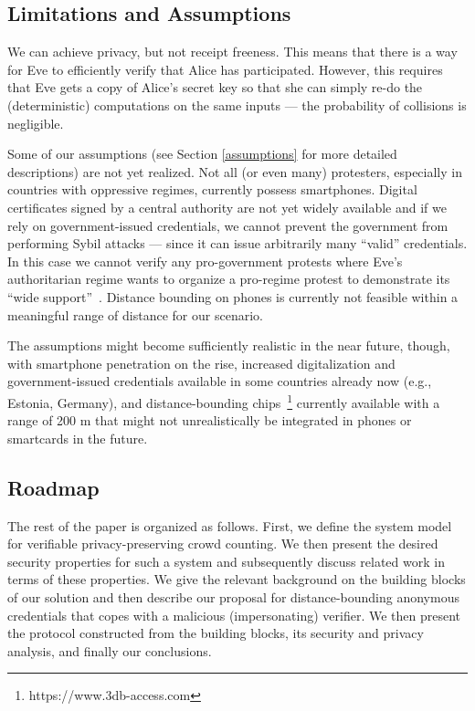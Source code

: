 \subsection{Limitations and Assumptions}

We can achieve privacy, but not receipt freeness.
This means that there is a way for Eve to efficiently verify that Alice has 
participated.
However, this requires that Eve gets a copy of Alice's secret key so that she 
can simply re-do the (deterministic) computations on the same inputs --- the 
probability of collisions is negligible.


Some of our assumptions (see Section \ref{assumptions} for more
detailed descriptions) are not yet
realized. Not all (or even many) protesters, especially in countries
with oppressive regimes, currently possess smartphones. Digital
certificates signed by a central authority are not yet widely
available and if we rely on government-issued credentials, we cannot prevent the government 
from performing Sybil attacks --- since it can issue arbitrarily many 
\enquote{valid} credentials. In this case we cannot verify any pro-government protests where Eve's authoritarian regime wants to organize a pro-regime protest to 
demonstrate its \enquote{wide 
  support}~\cite[e.g.][]{AlJazeeraOnVenezuela2017,VenezuelanStateWorkersCalledToParticipate}.
Distance bounding on phones is currently not feasible within a
meaningful range of distance for our scenario. 

The assumptions might
become sufficiently realistic in the near future, though, with
smartphone penetration on the rise, increased digitalization and government-issued credentials
available in some countries already now (e.g., Estonia, Germany), and
distance-bounding chips~\footnote{ https://www.3db-access.com } currently available with a range of 200 m that
might not unrealistically be integrated in phones or smartcards in the
future. 

\subsection{Roadmap}
The rest of the paper is organized as follows. First, we define the
system model for verifiable privacy-preserving crowd counting.  We then
present the desired security properties for such a system and subsequently discuss related
work in terms of these properties. We give the relevant background on
the building blocks of our solution and then describe our proposal for
distance-bounding anonymous credentials that copes with a malicious
(impersonating) verifier. We then present the protocol constructed
from the building blocks, its security and privacy analysis, and
finally our conclusions. 